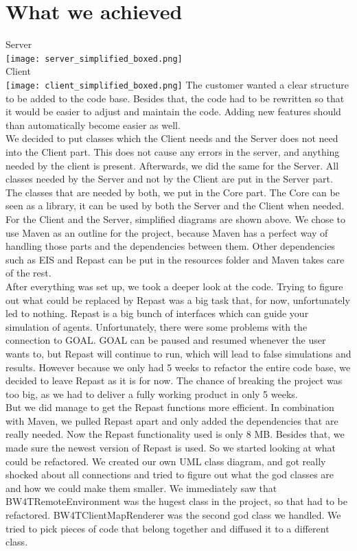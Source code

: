 \documentclass[11pt,a4paper]{article}
\begin{document}
\section{What we achieved}
Server \\
\texttt{[image: server\_simplified\_boxed.png]}
\\ Client \\
\texttt{[image: client\_simplified\_boxed.png]}
The customer wanted a clear structure to be added to the code base. Besides that, the code had to be rewritten so that it would be easier to adjust and maintain the code. Adding new features should than automatically become easier as well. \\
\indent We decided to put classes which the Client needs and the Server does not need into the Client part. This does not cause any errors in the server, and anything needed by the client is present. Afterwards, we did the same for the Server. All classes needed by the Server and not by the Client are put in the Server part. The classes that are needed by both, we put in the Core part. The Core can be seen as a library, it can be used by both the Server and the Client when needed. For the Client and the Server, simplified diagrams are shown above.
We chose to use Maven as an outline for the project, because Maven has a perfect way of handling those parts and the dependencies between them. Other dependencies such as EIS and Repast can be put in the resources folder and Maven takes care of the rest. \\
\indent After everything was set up, we took a deeper look at the code. Trying to figure out what could be replaced by Repast was a big task that, for now, unfortunately led to nothing. Repast is a big bunch of interfaces which can guide your simulation of agents. Unfortunately, there were some problems with the connection to GOAL. GOAL can be paused and resumed whenever the user wants to, but Repast will continue to run, which will lead to false simulations and results. However because we only had 5 weeks to refactor the entire code base, we decided to leave Repast as it is for now. The chance of breaking the project was too big, as we had to deliver a fully working product in only 5 weeks. \\
\indent But we did manage to get the Repast functions more efficient. In combination with Maven, we pulled Repast apart and only added the dependencies that are really needed. Now the Repast functionality used is only 8 MB. Besides that, we made sure the newest version of Repast is used.
So we started looking at what could be refactored. We created our own UML class diagram, and got really shocked about all connections and tried to figure out what the god classes are and how we could make them smaller. We immediately saw that BW4TRemoteEnvironment was the hugest class in the project, so that had to be refactored. BW4TClientMapRenderer was the second god class we handled. We tried to pick pieces of code that belong together and diffused it to a different class. \\
\end{document}
